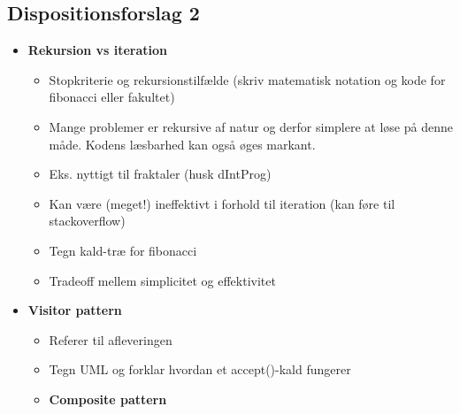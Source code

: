 \subsection{Dispositionsforslag 2}

\begin{itemize}
    \item \textbf{Rekursion vs iteration}
    \begin{itemize}
        \item Stopkriterie og rekursionstilfælde (skriv matematisk notation og kode for fibonacci eller fakultet)
        \item Mange problemer er rekursive af natur og derfor simplere at løse på denne måde. Kodens læsbarhed kan også øges markant.
        \item Eks. nyttigt til fraktaler (husk dIntProg)
        \item Kan være (meget!) ineffektivt i forhold til iteration (kan føre til stackoverflow)
        \item Tegn kald-træ for fibonacci
        \item Tradeoff mellem simplicitet og effektivitet
    \end{itemize}

    \item \textbf{Visitor pattern}
    \begin{itemize}
        \item Referer til afleveringen
        \item Tegn UML og forklar hvordan et accept()-kald fungerer
        \item \textbf{Composite pattern}
    \end{itemize}
\end{itemize}
